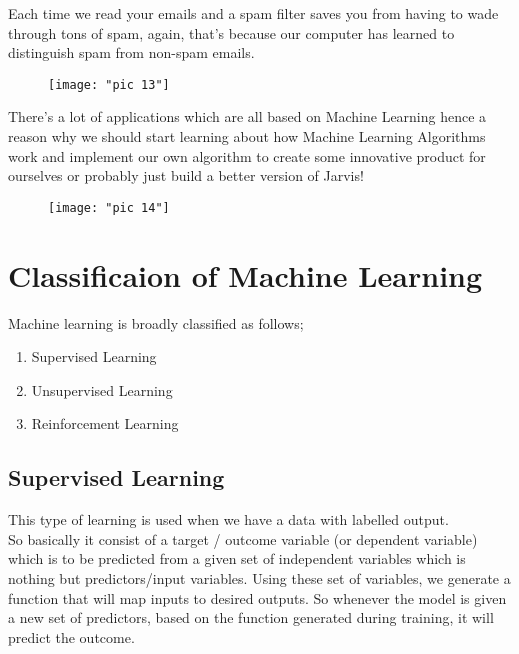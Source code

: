 \documentclass[Proceedings]{ascelike}
\begin{document}
 Each time we read your emails and a spam filter saves you from having to wade through tons of spam, again, that's because our computer has learned to distinguish spam from non-spam emails.\\
 
\begin{figure}[!ht]
 \centering
 \texttt{[image: "pic 13"]}
 \caption{}
 \label{fig:pic-13}
\end{figure}

There's a lot of applications which are all based on Machine Learning hence a reason why we should start learning about how Machine Learning Algorithms work and implement our own algorithm to create some innovative product for ourselves or probably just build a better version of Jarvis! 
 \begin{figure}
 	\centering
 	\texttt{[image: "pic 14"]}
 	\caption{}
 	\label{fig:pic-14}
 \end{figure}
 

\newpage
\section{Classificaion of Machine Learning}
Machine learning is broadly classified as follows;
\begin{enumerate}
	\item Supervised Learning
	\item Unsupervised Learning
	\item Reinforcement Learning
\end{enumerate}

\subsection{Supervised Learning}

This type of learning is used when we have a data with labelled output.
\\So basically it consist of a target / outcome variable (or dependent variable) which is to be predicted from a given set of independent variables which is nothing but predictors/input variables. Using these set of variables, we generate a function that will map inputs to desired outputs. So whenever the model is given a new set of predictors, based on the function generated during training, it will predict the outcome.\\
\end{document}
